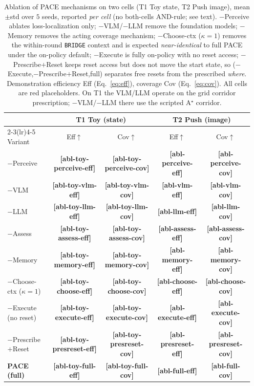 \documentclass[letterpaper]{article} %
\newcommand{\PH}[1]{{\color{red}\textbf{[#1]}}}
\begin{document}
\begin{table}[t]
\centering
\small
\caption{Ablation of PACE mechanisms on two cells (T1 Toy state, T2 Push image),
mean$\pm$std over $5$ seeds, reported \emph{per cell} (no both-cells AND-rule; see
text). $-$Perceive ablates loss-localization only; $-$VLM/$-$LLM remove the
foundation models; $-$Memory removes the acting coverage mechanism; $-$Choose-ctx
($\kappa{=}1$) removes the within-round \texttt{BRIDGE} context and is expected
\emph{near-identical} to full PACE under the on-policy default; $-$Execute is fully
on-policy with no reset access; $-$Prescribe$+$Reset keeps reset access but does not
move the start state, so ($-$Execute,$-$Prescribe$+$Reset,full) separates free
resets from the prescribed \emph{where}. Demonstration
efficiency Eff (Eq.~\ref{eq:eff}), coverage Cov (Eq.~\ref{eq:cov}). All cells are
red placeholders. On T1 the VLM/LLM operate on the grid corridor prescription;
$-$VLM/$-$LLM there use the scripted A$^\star$ corridor.}
\label{tab:ablation}
\begin{tabular}{l cc cc}
\toprule
 & \multicolumn{2}{c}{T1 Toy (state)} & \multicolumn{2}{c}{T2 Push (image)} \\
\cmidrule(lr){2-3}\cmidrule(lr){4-5}
Variant & Eff$\uparrow$ & Cov$\uparrow$ & Eff$\uparrow$ & Cov$\uparrow$ \\
\midrule
$-$Perceive & \PH{abl-toy-perceive-eff} & \PH{abl-toy-perceive-cov} & \PH{abl-perceive-eff} & \PH{abl-perceive-cov} \\
$-$VLM      & \PH{abl-toy-vlm-eff}      & \PH{abl-toy-vlm-cov}      & \PH{abl-vlm-eff}      & \PH{abl-vlm-cov} \\
$-$LLM      & \PH{abl-toy-llm-eff}      & \PH{abl-toy-llm-cov}      & \PH{abl-llm-eff}      & \PH{abl-llm-cov} \\
$-$Assess   & \PH{abl-toy-assess-eff}   & \PH{abl-toy-assess-cov}   & \PH{abl-assess-eff}   & \PH{abl-assess-cov} \\
$-$Memory   & \PH{abl-toy-memory-eff}   & \PH{abl-toy-memory-cov}   & \PH{abl-memory-eff}   & \PH{abl-memory-cov} \\
$-$Choose-ctx ($\kappa{=}1$) & \PH{abl-toy-choose-eff} & \PH{abl-toy-choose-cov} & \PH{abl-choose-eff} & \PH{abl-choose-cov} \\
$-$Execute (no reset) & \PH{abl-toy-execute-eff}  & \PH{abl-toy-execute-cov}  & \PH{abl-execute-eff}  & \PH{abl-execute-cov} \\
$-$Prescribe$+$Reset  & \PH{abl-toy-presreset-eff} & \PH{abl-toy-presreset-cov} & \PH{abl-presreset-eff} & \PH{abl-presreset-cov} \\
\midrule
\textbf{PACE (full)} & \PH{abl-toy-full-eff} & \PH{abl-toy-full-cov} & \PH{abl-full-eff} & \PH{abl-full-cov} \\
\bottomrule
\end{tabular}
\end{table}
\end{document}
